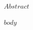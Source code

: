 \documentclass[mstat,12pt]{unswthesis}
\begin{document}


$Abstract$



\afterpreface





%
%






$body$
\end{document}
